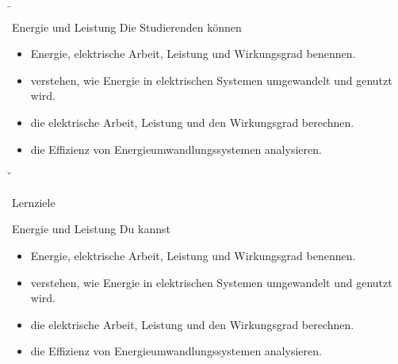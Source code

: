 \b{
\begin{frame} 
\begin{Lernziele}{Energie und Leistung} %
Die Studierenden können
\begin{itemize}

	\item Energie, elektrische Arbeit, Leistung und Wirkungsgrad benennen.
	\item verstehen, wie Energie in elektrischen Systemen umgewandelt und genutzt wird.
	\item die elektrische Arbeit, Leistung und den Wirkungsgrad berechnen.
	\item die Effizienz von Energieumwandlungssystemen analysieren.

\end{itemize}
\end{Lernziele} %
\end{frame}
}
\v{
\begin{frame}{Lernziele}
\begin{Lernziele}{Energie und Leistung} %
Du kannst
\begin{itemize}

	\item Energie, elektrische Arbeit, Leistung und Wirkungsgrad benennen.
	\item verstehen, wie Energie in elektrischen Systemen umgewandelt und genutzt wird.
	\item die elektrische Arbeit, Leistung und den Wirkungsgrad berechnen.
	\item die Effizienz von Energieumwandlungssystemen analysieren.

\end{itemize}
\end{Lernziele} %
\end{frame}
}

